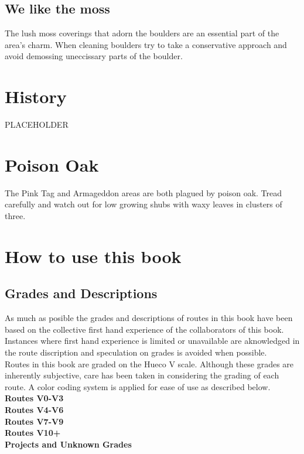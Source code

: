 \begin{multicols*}{2}
\subsection*{We like the moss}
The lush moss coverings that adorn the boulders are an essential part of the area's charm. When cleaning boulders try to take a conservative approach and avoid demossing uneccissary parts of the boulder.
\section{History}
PLACEHOLDER
\section{Poison Oak}
The Pink Tag and Armageddon areas are both plagued by poison oak. Tread carefully and watch out for low growing shubs with waxy leaves in clusters of three.
\section{How to use this book}
\subsection*{Grades and Descriptions}
As much as posible the grades and descriptions of routes in this book have been based on the collective first hand experience of the collaborators of this book. Instances where first hand experience is limited or unavailable are aknowledged in the route discription and speculation on grades is avoided when possible. \\
Routes in this book are graded on the Hueco V scale. Although these grades are inherently subjective, care has been taken in considering the grading of each route. A color coding system is applied for ease of use as described below.\\
\colorbox{green!20}{\textbf{Routes V0-V3}}\\
\colorbox{RoyalBlue!20}{\textbf{Routes V4-V6}}\\
\colorbox{Goldenrod!50}{\textbf{Routes V7-V9}}\\
\colorbox{red!20}{\textbf{Routes V10+}}\\
\colorbox{black!20}{\textbf{Projects and Unknown Grades}}\\

\end{multicols*}
